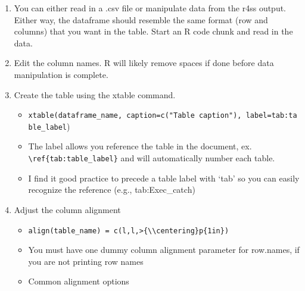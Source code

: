 \documentclass[12pt,]{article}
\providecommand{\tightlist}{%
  \setlength{\itemsep}{0pt}\setlength{\parskip}{0pt}}
\begin{document}
\begin{enumerate}
\def\labelenumi{\arabic{enumi}.}
\item
  You can either read in a .csv file or manipulate data from the r4ss
  output. Either way, the dataframe should resemble the same format (row
  and columns) that you want in the table. Start an R code chunk and
  read in the data.
\item
  Edit the column names. R will likely remove spaces if done before data
  manipulation is complete.
\item
  Create the table using the xtable command.

  \begin{itemize}
  \tightlist
  \item
    \texttt{xtable(dataframe\_name,\ caption=c("Table\ caption"),\ label=\textquotesingle{}tab:table\_label})
  \item
    The label allows you reference the table in the document, ex.
    \texttt{\textbackslash{}ref\{tab:table\_label\}} and will
    automatically number each table.
  \item
    I find it good practice to precede a table label with `tab' so you
    can easily recognize the reference (e.g., tab:Exec\_catch)
  \end{itemize}
\item
  Adjust the column alignment

  \begin{itemize}
  \tightlist
  \item
    \texttt{align(table\_name)\ =\ c(\textquotesingle{}l\textquotesingle{},\textquotesingle{}l\textquotesingle{},\textquotesingle{}\textgreater{}\{\textbackslash{}\textbackslash{}centering\}p\{1in\}\textquotesingle{})}
  \item
    You must have one dummy column alignment parameter for row.names, if
    you are not printing row names\\
  \item
    Common alignment options


\end{itemize}
\end{enumerate}
\end{document}
